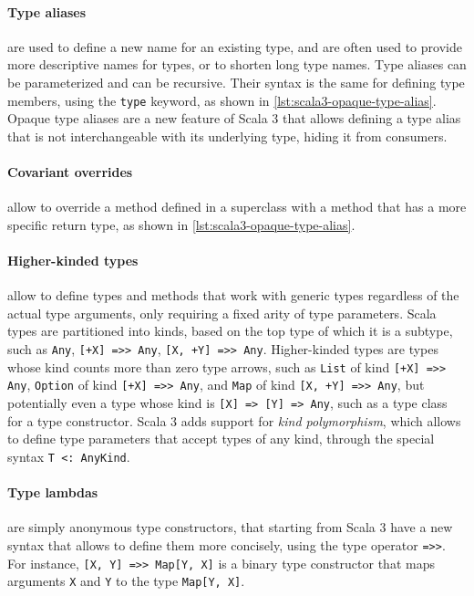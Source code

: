 \paragraph{Type aliases} are used to define a new name for an existing type, and are often used to provide more descriptive names for types, or to shorten long type names.
%
Type aliases can be parameterized and can be recursive.
%
Their syntax is the same for defining type members, using the \texttt{type} keyword, as shown in \cref{lst:scala3-opaque-type-alias}.
%
Opaque type aliases are a new feature of Scala 3 that allows defining a type alias that is not interchangeable with its underlying type, hiding it from consumers.



\paragraph{Covariant overrides} allow to override a method defined in a superclass with a method that has a more specific return type, as shown in \cref{lst:scala3-opaque-type-alias}.

\paragraph{Higher-kinded types} allow to define types and methods that work with generic types regardless of the actual type arguments, only requiring a fixed arity of type parameters.
%
Scala types are partitioned into kinds, based on the top type of which it is a subtype, such as \texttt{Any}, \texttt{[+X] =>> Any}, \texttt{[X, +Y] =>> Any}.
%
Higher-kinded types are types whose kind counts more than zero type arrows, such as \texttt{List} of kind \texttt{[+X] =>> Any}, \texttt{Option} of kind \texttt{[+X] =>> Any}, and \texttt{Map} of kind \texttt{[X, +Y] =>> Any}, but potentially even a type whose kind is \texttt{[X] => [Y] => Any}, such as a type class for a type constructor.
%
Scala 3 adds support for \textit{kind polymorphism}, which allows to define type parameters that accept types of any kind, through the special syntax \texttt{T <: AnyKind}.

\paragraph{Type lambdas} are simply anonymous type constructors, that starting from Scala 3 have a new syntax that allows to define them more concisely, using the type operator \texttt{=>>}.
%
For instance, \texttt{[X, Y] =>> Map[Y, X]} is a binary type constructor that maps arguments \texttt{X} and \texttt{Y} to the type \texttt{Map[Y, X]}.

